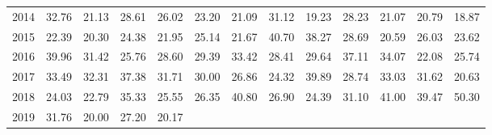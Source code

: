 \begin{longtable}{rrrrrrrrrrrrr}
  2014 & 32.76 & 21.13 & 28.61 & 26.02 & 23.20 & 21.09 & 31.12 & 19.23 & 28.23 & 21.07 & 20.79 & 18.87 \\ 
  2015 & 22.39 & 20.30 & 24.38 & 21.95 & 25.14 & 21.67 & 40.70 & 38.27 & 28.69 & 20.59 & 26.03 & 23.62 \\ 
  2016 & 39.96 & 31.42 & 25.76 & 28.60 & 29.39 & 33.42 & 28.41 & 29.64 & 37.11 & 34.07 & 22.08 & 25.74 \\ 
  2017 & 33.49 & 32.31 & 37.38 & 31.71 & 30.00 & 26.86 & 24.32 & 39.89 & 28.74 & 33.03 & 31.62 & 20.63 \\ 
  2018 & 24.03 & 22.79 & 35.33 & 25.55 & 26.35 & 40.80 & 26.90 & 24.39 & 31.10 & 41.00 & 39.47 & 50.30 \\ 
  2019 & 31.76 & 20.00 & 27.20 & 20.17 &  &  &  &  &  &  &  &  \\ 
   \hline
\hline
\end{longtable}
